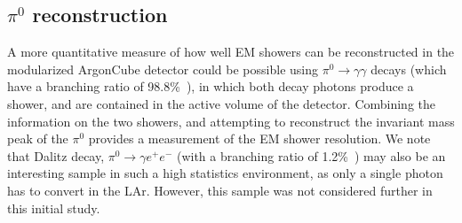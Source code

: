 \subsection{$\pi^{0}$ reconstruction}
A more quantitative measure of how well EM showers can be reconstructed in the modularized ArgonCube detector could be possible using $\pi^{0} \rightarrow \gamma\gamma$ decays (which have a branching ratio of 98.8\%~\cite{pdg_2018}), in which both decay photons produce a shower, and are contained in the active volume of the detector. Combining the information on the two showers, and attempting to reconstruct the invariant mass peak of the $\pi^{0}$ provides a measurement of the EM shower resolution. We note that Dalitz decay, $\pi^{0} \rightarrow \gamma e^{+} e^{-}$ (with a branching ratio of 1.2\%~\cite{pdg_2018}) may also be an interesting sample in such a high statistics environment, as only a single photon has to convert in the LAr. However, this sample was not considered further in this initial study.

